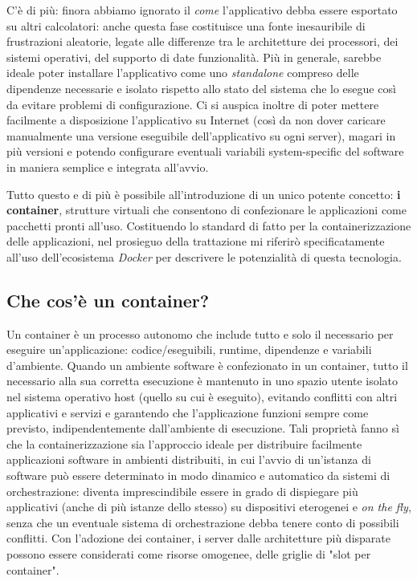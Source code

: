 C'è di più: finora abbiamo ignorato il \emph{come} l'applicativo debba essere esportato su altri calcolatori: anche questa fase costituisce una fonte inesauribile di frustrazioni aleatorie, legate alle differenze tra le architetture dei processori, dei sistemi operativi, del supporto di date funzionalità. Più in generale, sarebbe ideale poter installare l'applicativo come uno \emph{standalone} compreso delle dipendenze necessarie e isolato rispetto allo stato del sistema che lo esegue così da evitare problemi di configurazione. Ci si auspica inoltre di poter mettere facilmente a disposizione l'applicativo su Internet (così da non dover caricare manualmente una versione eseguibile dell'applicativo su ogni server), magari in più versioni e potendo configurare eventuali variabili system-specific del software in maniera semplice e integrata all'avvio.

Tutto questo e di più è possibile all'introduzione di un unico potente concetto: \textbf{i container}, strutture virtuali che consentono di confezionare le applicazioni come pacchetti pronti all'uso.
Costituendo lo standard di fatto per la containerizzazione delle applicazioni, nel prosieguo della trattazione mi riferirò specificatamente all'uso dell'ecosistema \emph{Docker} per descrivere le potenzialità di questa tecnologia.

\subsection{Che cos'è un container?}
Un container è un processo autonomo che include tutto e solo il necessario per eseguire un'applicazione: codice/eseguibili, runtime, dipendenze e variabili d'ambiente. Quando un ambiente software è confezionato in un container, tutto il necessario alla sua corretta esecuzione è mantenuto in uno spazio utente isolato nel sistema operativo host (quello su cui è eseguito), evitando conflitti con altri applicativi e servizi e garantendo che l'applicazione funzioni sempre come previsto, indipendentemente dall'ambiente di esecuzione.
Tali proprietà fanno sì che la containerizzazione sia l'approccio ideale per distribuire facilmente applicazioni software in ambienti distribuiti, in cui l'avvio di un'istanza di software può essere determinato in modo dinamico e automatico da sistemi di orchestrazione: diventa imprescindibile essere in grado di dispiegare più applicativi (anche di più istanze dello stesso) su dispositivi eterogenei e \emph{on the fly}, senza che un eventuale sistema di orchestrazione debba tenere conto di possibili conflitti. Con l'adozione dei container, i server dalle architetture più disparate possono essere considerati come risorse omogenee, delle griglie di "slot per container".

